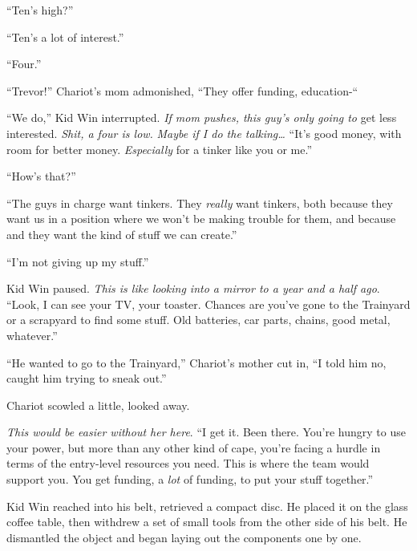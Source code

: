 ``Ten's high?''



``Ten's a lot of interest.''



``Four.''



``Trevor!'' Chariot's mom admonished, ``They offer funding, education-``



``We do,'' Kid Win interrupted.  \emph{If mom pushes, this guy's only going to }get less interested.  \emph{Shit, a four is low.  }\emph{Maybe if I do the talking\ldots} ``It's good money, with room for better money.  \emph{Especially} for a tinker like you or me.''



``How's that?''



``The guys in charge want tinkers.  They \emph{really} want tinkers, both because they want us in a position where we won't be making trouble for them, and because and they want the kind of stuff we can create.''



``I'm not giving up my stuff.''



Kid Win paused.  \emph{This is like looking into a mirror to a year and a half ago}.  ``Look, I can see your TV, your toaster.  Chances are you've gone to the Trainyard or a scrapyard to find some stuff.  Old batteries, car parts, chains, good metal, whatever.''



``He wanted to go to the Trainyard,'' Chariot's mother cut in, ``I told him no, caught him trying to sneak out.''



Chariot scowled a little, looked away.



\emph{This would be easier without her here}.  ``I get it.  Been there.  You're hungry to use your power, but more than any other kind of cape, you're facing a hurdle in terms of the entry-level resources you need.  This is where the team would support you.  You get funding, a \emph{lot} of funding, to put your stuff together.''



Kid Win reached into his belt, retrieved a compact disc.  He placed it on the glass coffee table, then withdrew a set of small tools from the other side of his belt.  He dismantled the object and began laying out the components one by one.



